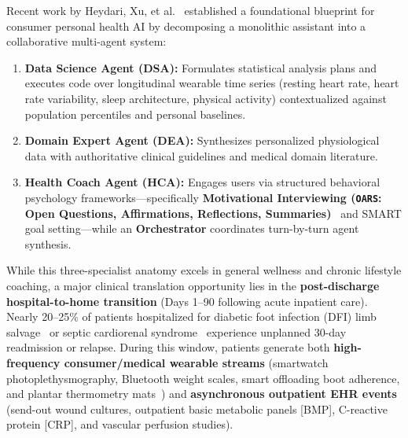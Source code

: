 \documentclass[10pt,twocolumn,letterpaper]{article}
\begin{document}
Recent work by Heydari, Xu, et al.~\cite{heydari2026anatomy} established a foundational blueprint for consumer personal health AI by decomposing a monolithic assistant into a collaborative multi-agent system:
\begin{enumerate}
    \item \textbf{Data Science Agent (DSA):} Formulates statistical analysis plans and executes code over longitudinal wearable time series (resting heart rate, heart rate variability, sleep architecture, physical activity) contextualized against population percentiles and personal baselines.
    \item \textbf{Domain Expert Agent (DEA):} Synthesizes personalized physiological data with authoritative clinical guidelines and medical domain literature.
    \item \textbf{Health Coach Agent (HCA):} Engages users via structured behavioral psychology frameworks---specifically \textbf{Motivational Interviewing (\texttt{OARS}: Open Questions, Affirmations, Reflections, Summaries)}~\cite{miller2012motivational} and SMART goal setting---while an \textbf{Orchestrator} coordinates turn-by-turn agent synthesis.
\end{enumerate}

While this three-specialist anatomy excels in general wellness and chronic lifestyle coaching, a major clinical translation opportunity lies in the \textbf{post-discharge hospital-to-home transition} (Days 1--90 following acute inpatient care). Nearly 20--25\% of patients hospitalized for diabetic foot infection (DFI) limb salvage~\cite{armstrong2023diabetic,senneville2024iwgdf} or septic cardiorenal syndrome~\cite{evans2021surviving,bozkurt2023diuretic} experience unplanned 30-day readmission or relapse. During this window, patients generate both \textbf{high-frequency consumer/medical wearable streams} (smartwatch photoplethysmography, Bluetooth weight scales, smart offloading boot adherence, and plantar thermometry mats~\cite{bus2024guidelines}) and \textbf{asynchronous outpatient EHR events} (send-out wound cultures, outpatient basic metabolic panels [BMP], C-reactive protein [CRP], and vascular perfusion studies).
\end{document}
